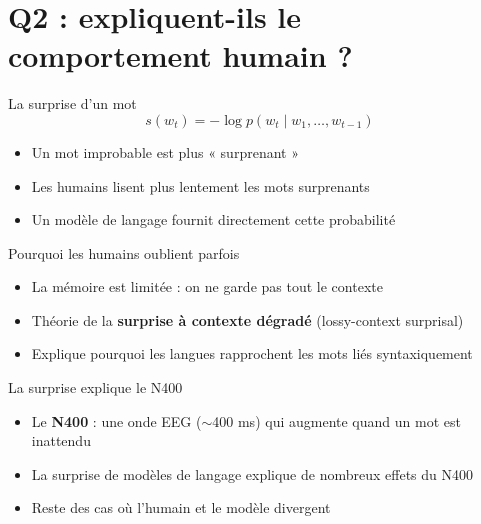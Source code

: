 \section{Q2 : expliquent-ils le comportement humain ?}

\begin{frame}{La surprise d'un mot}
\[
    s(w_t) = -\log p(w_t \mid w_1,\dots,w_{t-1})
\]
\begin{itemize}
    \item Un mot improbable est plus « surprenant »
    \item Les humains lisent plus lentement les mots surprenants
    \item Un modèle de langage fournit directement cette probabilité
\end{itemize}
\end{frame}

\begin{frame}{Pourquoi les humains oublient parfois}
\begin{itemize}
    \item La mémoire est limitée : on ne garde pas tout le contexte
    \item Théorie de la \textbf{surprise à contexte dégradé} (lossy-context surprisal)
    \item Explique pourquoi les langues rapprochent les mots liés syntaxiquement
\end{itemize}
\end{frame}

\begin{frame}{La surprise explique le N400}
\begin{itemize}
    \item Le \textbf{N400} : une onde EEG ($\sim$400 ms) qui augmente quand un mot est inattendu
    \item La surprise de modèles de langage explique de nombreux effets du N400
    \item Reste des cas où l'humain et le modèle divergent
\end{itemize}
\end{frame}

